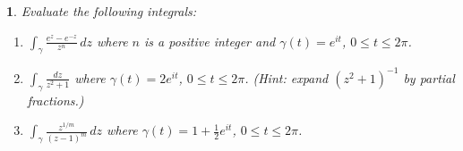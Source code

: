 \documentclass[12pt, a4paper]{report}
\theoremstyle{spaced}
\newtheorem{exercise}{}
\newcommand{\setexercise}[1]{\setcounter{exercise}{#1-1}}
\begin{document}
\setexercise{9}
\begin{exercise}
	Evaluate the following integrals:
	\begin{enumerate}[label=(\alph*)]
		\item $\displaystyle \int_{\gamma} \frac{e^{z}-e^{-z}}{z^{n}}\,dz$
		      where $n$ is a positive integer and $\gamma(t)=e^{it}$, $0\le t\le 2\pi$.


		\item[(c)] $\displaystyle \int_{\gamma} \frac{dz}{z^{2}+1}$
			where $\gamma(t)=2e^{it}$, $0\le t\le 2\pi$. (Hint: expand $(z^{2}+1)^{-1}$ by partial fractions.)


		\item[(e)] $\displaystyle \int_{\gamma} \frac{z^{1/m}}{(z-1)^{m}}\,dz$
			where $\gamma(t)=1+\tfrac12 e^{it}$, $0\le t\le 2\pi$.
	\end{enumerate}
\end{exercise}
\end{document}
